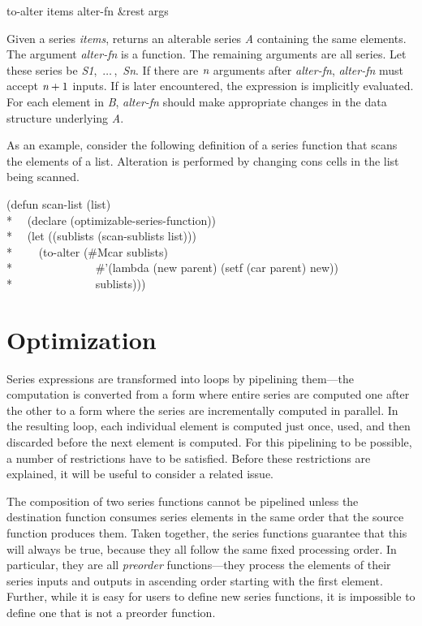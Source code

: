 \begin{defun}[Function]
to-alter items alter-fn &rest args

Given a series \emph{items},  returns an alterable series {\it
A} containing the same elements.  The argument \emph{alter-fn} is a
function.  The remaining arguments are all series.  Let these series be
\emph{S1},~$\ldots\,$,~\emph{Sn}.  If there are $\emph{n}$ arguments after \emph{alter-fn},
\emph{alter-fn} must accept $\emph{n}+1$ inputs.  If  is
later encountered, the expression
 is implicitly
evaluated.  For each
element in \emph{B}, \emph{alter-fn} should make appropriate changes in the
data structure underlying \emph{A}.

As an example, consider the following definition of a series function
that scans the elements of a list.  Alteration is performed by
changing cons cells in the list being scanned.
\begin{lisp}
(defun scan-list (list) \\*
~~(declare (optimizable-series-function)) \\*
~~(let ((sublists (scan-sublists list))) \\*
~~~~(to-alter (\#Mcar sublists) \\*
~~~~~~~~~~~~~~\#'(lambda (new parent) (setf (car parent) new)) \\*
~~~~~~~~~~~~~~sublists)))
\end{lisp}
\end{defun}

\section{Optimization}\label{SERIES-E-SECTION}

Series expressions are transformed into loops by pipelining them---the
computation is converted from a form where entire series are computed one
after the other to a form where the series are incrementally computed in
parallel.  In the resulting loop, each individual element is computed just
once, used, and then discarded before the next element is computed.  For
this pipelining to be possible, a number of restrictions have to be
satisfied.  Before these restrictions are explained, it will be useful to consider
a related issue.

The composition of two series functions cannot be pipelined unless the
destination function consumes series elements in the same order that the source
function produces them.  Taken together, the series functions guarantee
that this will always be true, because they all follow the same fixed
processing order.  In particular, they are all \emph{preorder\/}
functions---they process the elements of their series inputs and outputs in
ascending order starting with the first element.  Further, while it is easy
for users to define new series functions, it is impossible to define one
that is not a preorder function.

